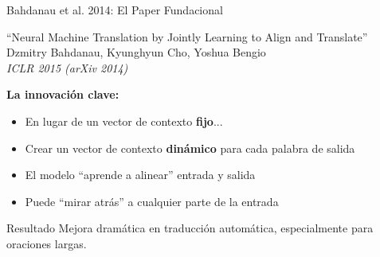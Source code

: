 \documentclass[aspectratio=169]{beamer}
\begin{document}
\begin{frame}{Bahdanau et al. 2014: El Paper Fundacional}
    \begin{block}{``Neural Machine Translation by Jointly Learning to Align and Translate''}
        Dzmitry Bahdanau, Kyunghyun Cho, Yoshua Bengio\\
        \textit{ICLR 2015 (arXiv 2014)}
    \end{block}
    
    \vspace{0.3cm}
    \textbf{La innovación clave:}
    \begin{itemize}
        \item En lugar de un vector de contexto \textbf{fijo}...
        \item Crear un vector de contexto \textbf{dinámico} para cada palabra de salida
        \item El modelo ``aprende a alinear'' entrada y salida
        \item Puede ``mirar atrás'' a cualquier parte de la entrada
    \end{itemize}
    
    \vspace{0.3cm}
    \begin{exampleblock}{Resultado}
        Mejora dramática en traducción automática, especialmente para oraciones largas.
    \end{exampleblock}
\end{frame}
\end{document}
